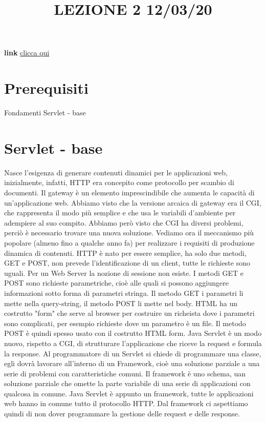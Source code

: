 \title{LEZIONE 2 12/03/20}\newline
\textbf{link} \href{https://web.microsoftstream.com/video/58568b1d-5fc5-41c0-88f6-608e4b8f9f7a}{clicca qui}
\section*{Prerequisiti}
Fondamenti Servlet - base
\section{Servlet - base}
Nasce l'esigenza di generare contenuti dinamici per le applicazioni web, inizialmente, infatti, HTTP era concepito come protocollo per scambio di documenti.\newline
Il gateway è un elemento imprescindibile che aumenta le capacità di un'applicazione web. Abbiamo visto che la versione arcaica di gateway era il CGI, che rappresenta il modo più semplice e che usa le variabili d'ambiente per adempiere al suo compito. Abbiamo però visto che CGI ha diversi problemi, perciò è necessario trovare una nuova soluzione.\newline
Vediamo ora il meccanismo più popolare (almeno fino a qualche anno fa) per realizzare i requisiti di produzione dinamica di contenuti. HTTP è nato per essere semplice, ha solo due metodi, GET e POST, non prevede l'identificazione di un client, tutte le richieste sono uguali. Per un Web Server la nozione di sessione non esiste. I metodi GET e POST sono richieste parametriche, cioè alle quali si possono aggiungere informazioni sotto forma di parametri stringa. Il metodo GET i parametri li mette nella query-string, il metodo POST li mette nel body. HTML ha un costrutto "form" che serve al browser per costruire un richeista dove i parametri sono complicati, per esempio richieste dove un parametro è un file. Il metodo POST è quindi spesso usato con il costrutto HTML form.\newline
Java Servlet è un modo nuovo, rispetto a CGI, di strutturare l'applicazione che riceve la request e formula la response.\newline
Al programmatore di un Servlet si chiede di programmare una classe, egli dovrà lavorare all'interno di un Framework, cioè una soluzione parziale a una serie di problemi con caratteristiche comuni. Il framework è uno schema, uan soluzione parziale che omette la parte variabile di una serie di applicazioni con qualcosa in comune. Java Servlet è appunto un framework, tutte le applicazioni web hanno in comune tutto il protocollo HTTP. Dal framework ci aspettiamo quindi di non dover programmare la gestione delle request e delle response.\newline
